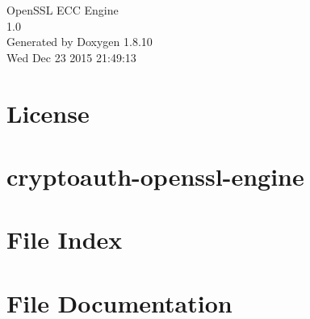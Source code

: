 \documentclass[twoside]{book}
\newcommand{\+}{\discretionary{\mbox{\scriptsize$\hookleftarrow$}}{}{}}
\newcommand{\clearemptydoublepage}{%
  \newpage{\pagestyle{empty}\cleardoublepage}%
}
\begin{document}
\hypersetup{pageanchor=false,
             bookmarks=true,
             bookmarksnumbered=true,
             pdfencoding=unicode
            }
\begin{titlepage}
\vspace*{7cm}
\begin{center}%
{\Large Open\+S\+S\+L E\+C\+C Engine \\[1ex]\large 1.\+0 }\\
\vspace*{1cm}
{\large Generated by Doxygen 1.8.10}\\
\vspace*{0.5cm}
{\small Wed Dec 23 2015 21:49:13}\\
\end{center}
\end{titlepage}
\clearemptydoublepage
\tableofcontents
\clearemptydoublepage
{}
\hypersetup{pageanchor=true}

\chapter{License}
\label{_license}
\hypertarget{_license}{}

\chapter{cryptoauth-\/openssl-\/engine}
\label{md__c_1__source__git_lab__ca_sw__open_s_s_l_atmel-ecc_engine_atecc_engine_meth__r_e_a_d_m_e}
\hypertarget{md__c_1__source__git_lab__ca_sw__open_s_s_l_atmel-ecc_engine_atecc_engine_meth__r_e_a_d_m_e}{}

\chapter{File Index}

\chapter{File Documentation}
















\backmatter
\newpage
{}
\clearemptydoublepage
{}
\printindex
\end{document}
